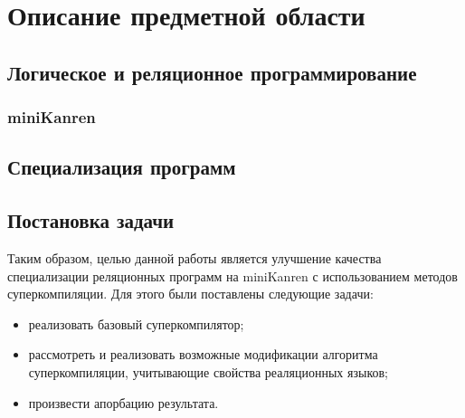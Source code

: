 \section{Описание предметной области}

\subsection{Логическое и реляционное программирование}





\subsubsection{miniKanren}



\subsection{Специализация программ}



\subsection{Постановка задачи}

Таким образом, целью данной работы является улучшение качества специализации
реляционных программ на miniKanren с использованием методов суперкомпиляции.
Для этого были поставлены следующие задачи:
\begin{itemize}
\item реализовать базовый суперкомпилятор;
\item рассмотреть и реализовать возможные модификации алгоритма суперкомпиляции,
      учитывающие свойства реаляционных языков;
\item произвести апорбацию результата.
\end{itemize}
